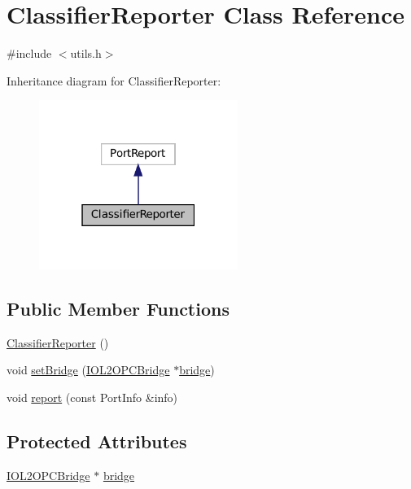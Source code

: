 \hypertarget{classClassifierReporter}{}\section{Classifier\+Reporter Class Reference}
\label{classClassifierReporter}


{\ttfamily \#include $<$utils.\+h$>$}



Inheritance diagram for Classifier\+Reporter\+:
\nopagebreak
\begin{figure}[H]
\begin{center}
\leavevmode
\includegraphics[width=183pt]{classClassifierReporter__inherit__graph}
\end{center}
\end{figure}
\subsection*{Public Member Functions}
\begin{DoxyCompactItemize}
\item 
\hyperlink{classClassifierReporter_af28cc4673f745cf3b724f98c9b3e7bcf}{Classifier\+Reporter} ()
\item 
void \hyperlink{classClassifierReporter_a06fe36031a27e4bfae35ba038f67eb9d}{set\+Bridge} (\hyperlink{group__iol2opc_classIOL2OPCBridge}{I\+O\+L2\+O\+P\+C\+Bridge} $\ast$\hyperlink{classClassifierReporter_a84b4769137f381ba4c0c21ae4b26bf14}{bridge})
\item 
void \hyperlink{classClassifierReporter_ac6b247b3f9f7f48d0363702f0d82c5d8}{report} (const Port\+Info \&info)
\end{DoxyCompactItemize}
\subsection*{Protected Attributes}
\begin{DoxyCompactItemize}
\item 
\hyperlink{group__iol2opc_classIOL2OPCBridge}{I\+O\+L2\+O\+P\+C\+Bridge} $\ast$ \hyperlink{classClassifierReporter_a84b4769137f381ba4c0c21ae4b26bf14}{bridge}
\end{DoxyCompactItemize}


